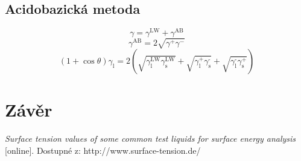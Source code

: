 \documentclass{protokol}
\begin{document}
\subsection{Acidobazická metoda}
\begin{equation}
	\gamma = \gamma^{\text{LW}} + \gamma^{\text{AB}}
\end{equation}
\begin{equation}
	\gamma^{\text{AB}} = 2\sqrt{\gamma^+\gamma^-}
\end{equation}
\begin{equation}
		\left(1+\cos\theta\right)\gamma_{\text{l}} = 
		2\left(\sqrt{\gamma_\text{l}^{\text{LW}}\gamma_\text{s}^{\text{LW}}} + 
		\sqrt{\gamma_\text{l}^{\text{+}}\gamma_\text{s}^{\text{-}}} + 
		\sqrt{\gamma_\text{l}^{\text{-}}\gamma_\text{s}^{\text{+}}}\right)
\end{equation}
\par 







\section{Závěr}

\begin{thebibliography}{10}
	 {\textit{Surface tension values of some common test 
	liquids 
	for surface energy analysis} [online]. Dostupné z: 
	http://www.surface-tension.de/}
	
\end{thebibliography}
\end{document}
